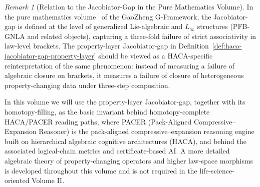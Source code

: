 \documentclass[11pt]{book}
\theoremstyle{plain}
\theoremstyle{definition}
\theoremstyle{remark}
\newtheorem{remark}[theorem]{Remark}
\begin{document}
\begin{remark}[Relation to the Jacobiator-Gap in the Pure Mathematics Volume]
\label{rem:haca-jacobiator-gap-puremath}
In the pure mathematics volume~\cite{GaoZheng2025GFramework} of the GaoZheng G-Framework, the
Jacobiator-gap is defined at the level of generalized Lie-algebraic and
$L_\infty$ structures (PFB-GNLA and related objects), capturing a
three-fold failure of strict associativity in law-level brackets. The
property-layer Jacobiator-gap in
Definition~\ref{def:haca-jacobiator-gap-property-layer} should be viewed as
a HACA-specific reinterpretation of the same phenomenon: instead of
measuring a failure of algebraic closure on brackets, it measures a failure
of closure of heterogeneous property-changing data under three-step
composition.

In this volume we will use the property-layer Jacobiator-gap, together
with its homotopy-filling, as the basic invariant behind homotopy-complete
HACA/PACER reading paths, where PACER (Pack-Aligned Compressive–Expansion
Reasoner) is the pack-aligned compressive–expansion reasoning engine
built on hierarchical algebraic cognitive architectures (HACA), and behind
the associated logical-chain metrics and certificate-based AI. A
more detailed algebraic theory of property-changing operators and higher
law-space morphisms is developed throughout this volume and is not required
in the life-science-oriented Volume II.
\end{remark}
\end{document}
